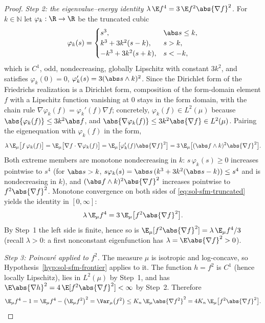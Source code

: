 \documentclass[../main.tex]{subfiles}
\begin{document}
\begin{proof}
\medskip
\noindent\emph{Step 2: the eigenvalue--energy identity
$\lambda\,\E f^4=3\,\E f^2\abs{\nabla f}^2$.}
For $k\in\mathbb N$ let $\varphi_k:\R\to\R$ be the truncated cubic
\[
  \varphi_k(s)=
  \begin{cases}
    s^3, & \abs s\le k,\\
    k^3+3k^2(s-k), & s>k,\\
    -k^3+3k^2(s+k), & s<-k,
  \end{cases}
\]
which is $C^1$, odd, nondecreasing, globally Lipschitz with constant $3k^2$, and
satisfies $\varphi_k(0)=0$, $\varphi_k'(s)=3(\abs s\wedge k)^2$.  Since the Dirichlet
form of the Friedrichs realization is a Dirichlet form, composition of the
form-domain element $f$ with a Lipschitz function vanishing at $0$ stays in the form
domain, with the chain rule $\nabla\varphi_k(f)=\varphi_k'(f)\nabla f$; concretely,
$\varphi_k(f)\in L^2(\mu)$ because $\abs{\varphi_k(f)}\le3k^2\abs f$, and
$\abs{\nabla\varphi_k(f)}\le3k^2\abs{\nabla f}\in L^2(\mu)$.  Pairing the
eigenequation with $\varphi_k(f)$ in the form,
\begin{equation}
  \lambda\,\E_\mu\bigl[f\,\varphi_k(f)\bigr]
  =\E_\mu\bigl[\nabla f\cdot\nabla\varphi_k(f)\bigr]
  =\E_\mu\bigl[\varphi_k'(f)\abs{\nabla f}^2\bigr]
  =3\,\E_\mu\bigl[(\abs f\wedge k)^2\abs{\nabla f}^2\bigr].
  \label{eq:sol-sfm-truncated}
\end{equation}
Both extreme members are monotone nondecreasing in $k$:
$s\,\varphi_k(s)\ge0$ increases pointwise to $s^4$ (for $\abs s>k$,
$s\varphi_k(s)=\abs s\,(k^3+3k^2(\abs s-k))\le s^4$ and is nondecreasing in $k$), and
$(\abs f\wedge k)^2\abs{\nabla f}^2$ increases pointwise to $f^2\abs{\nabla f}^2$.
Monotone convergence on both sides of \eqref{eq:sol-sfm-truncated} yields the identity
in $[0,\infty]$:
\begin{equation}
  \lambda\,\E_\mu f^4=3\,\E_\mu\bigl[f^2\abs{\nabla f}^2\bigr].
  \label{eq:sol-sfm-identity}
\end{equation}
By Step~1 the left side is finite, hence so is
$\E_\mu[f^2\abs{\nabla f}^2]=\lambda\,\E_\mu f^4/3$ (recall $\lambda>0$: a first
nonconstant eigenfunction has $\lambda=\E\abs{\nabla f}^2>0$).

\medskip
\noindent\emph{Step 3: Poincar\'e applied to $f^2$.}
The measure $\mu$ is isotropic and log-concave, so
Hypothesis~\ref{hyp:sol-sfm-frontier} applies to it.  The function $h=f^2$ is $C^1$
(hence locally Lipschitz), lies in $L^2(\mu)$ by Step~1, and has
$\E\abs{\nabla h}^2=4\,\E[f^2\abs{\nabla f}^2]<\infty$ by Step~2.  Therefore
\begin{equation}
  \E_\mu f^4-1=\E_\mu f^4-\bigl(\E_\mu f^2\bigr)^2=\Var_\mu\bigl(f^2\bigr)
  \le K_n\,\E_\mu\abs{\nabla f^2}^2
  =4K_n\,\E_\mu\bigl[f^2\abs{\nabla f}^2\bigr].
  \label{eq:sol-sfm-poincare}
\end{equation}


\end{proof}
\end{document}
